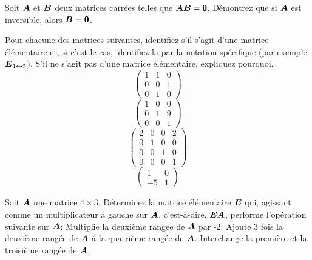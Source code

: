 \begin{TwoCol}
 \begin{exercice}
 Soit $\boldsymbol{A}$ et $\boldsymbol{B}$ deux matrices carrées telles que $\boldsymbol{A}\boldsymbol{B} = \mbox{\textsf{\textbf{{0}}}}$.
 Démontrez que si $\boldsymbol{A}$ est inversible, alors $\boldsymbol{B}=\mbox{\textsf{\textbf{{0}}}}$.
 \end{exercice}
 \begin{exercice}
 Pour chacune des matrices suivantes, identifiez s'il s'agit d'une matrice élémentaire et, si c'est le cas,
 identifiez la par la notation spécifique (par exemple $\boldsymbol{E}_{1\leftrightarrow5}$).
 S'il ne s'agit pas d'une matrice élémentaire, expliquez pourquoi.
 \[
 \begin{pmatrix}
 1 & 1 & 0 \\
 0 & 0 & 1 \\
 0 & 1 & 0
 \end{pmatrix}
  \]
 \[
 \begin{pmatrix}
 1 & 0 & 0 \\
 0 & 1 & 9 \\
 0 & 0 & 1
 \end{pmatrix}
  \]
 \[
 \begin{pmatrix}
 2 & 0 & 0 & 2\\
 0 & 1 & 0 & 0 \\
 0 & 0 & 1 & 0 \\
 0 & 0 & 0 & 1
 \end{pmatrix}
  \]
 \[
 \begin{pmatrix}
 1 & 0 \\
 -5 & 1 
 \end{pmatrix}
  \]
   \end{exercice}
   
   \begin{exercice}
   Soit $\boldsymbol{A}$ une matrice $4\times3$.  Déterminez la matrice élémentaire $\boldsymbol{E}$ qui, agissant comme
   un multiplicateur à gauche sur $\boldsymbol{A}$, c'est-à-dire, $\boldsymbol{E}\boldsymbol{A}$, performe l'opération suivante
   sur $\boldsymbol{A}$:
    Multiplie la deuxième rangée de $\boldsymbol{A}$ par -2.
    Ajoute 3 fois la deuxième rangée de $\boldsymbol{A}$ à la quatrième rangée de $\boldsymbol{A}$. 
    Interchange la première et la troisième rangée de $\boldsymbol{A}$.
   \end{exercice}
   

\end{TwoCol}
